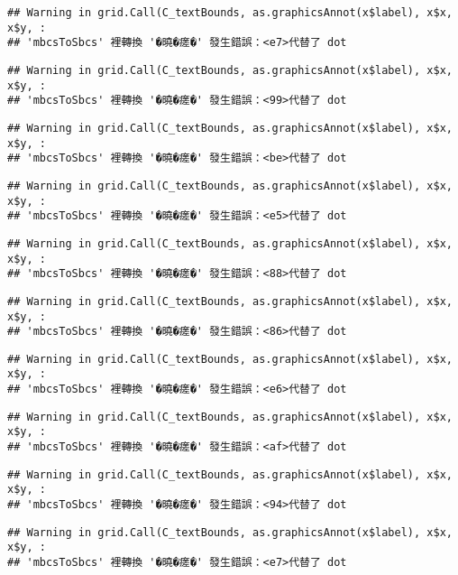 \documentclass[
]{article}
\begin{document}
\begin{verbatim}
## Warning in grid.Call(C_textBounds, as.graphicsAnnot(x$label), x$x, x$y, :
## 'mbcsToSbcs' 裡轉換 '�曉�瘥�' 發生錯誤：<e7>代替了 dot
\end{verbatim}

\begin{verbatim}
## Warning in grid.Call(C_textBounds, as.graphicsAnnot(x$label), x$x, x$y, :
## 'mbcsToSbcs' 裡轉換 '�曉�瘥�' 發生錯誤：<99>代替了 dot
\end{verbatim}

\begin{verbatim}
## Warning in grid.Call(C_textBounds, as.graphicsAnnot(x$label), x$x, x$y, :
## 'mbcsToSbcs' 裡轉換 '�曉�瘥�' 發生錯誤：<be>代替了 dot
\end{verbatim}

\begin{verbatim}
## Warning in grid.Call(C_textBounds, as.graphicsAnnot(x$label), x$x, x$y, :
## 'mbcsToSbcs' 裡轉換 '�曉�瘥�' 發生錯誤：<e5>代替了 dot
\end{verbatim}

\begin{verbatim}
## Warning in grid.Call(C_textBounds, as.graphicsAnnot(x$label), x$x, x$y, :
## 'mbcsToSbcs' 裡轉換 '�曉�瘥�' 發生錯誤：<88>代替了 dot
\end{verbatim}

\begin{verbatim}
## Warning in grid.Call(C_textBounds, as.graphicsAnnot(x$label), x$x, x$y, :
## 'mbcsToSbcs' 裡轉換 '�曉�瘥�' 發生錯誤：<86>代替了 dot
\end{verbatim}

\begin{verbatim}
## Warning in grid.Call(C_textBounds, as.graphicsAnnot(x$label), x$x, x$y, :
## 'mbcsToSbcs' 裡轉換 '�曉�瘥�' 發生錯誤：<e6>代替了 dot
\end{verbatim}

\begin{verbatim}
## Warning in grid.Call(C_textBounds, as.graphicsAnnot(x$label), x$x, x$y, :
## 'mbcsToSbcs' 裡轉換 '�曉�瘥�' 發生錯誤：<af>代替了 dot
\end{verbatim}

\begin{verbatim}
## Warning in grid.Call(C_textBounds, as.graphicsAnnot(x$label), x$x, x$y, :
## 'mbcsToSbcs' 裡轉換 '�曉�瘥�' 發生錯誤：<94>代替了 dot
\end{verbatim}

\begin{verbatim}
## Warning in grid.Call(C_textBounds, as.graphicsAnnot(x$label), x$x, x$y, :
## 'mbcsToSbcs' 裡轉換 '�曉�瘥�' 發生錯誤：<e7>代替了 dot
\end{verbatim}
\end{document}
